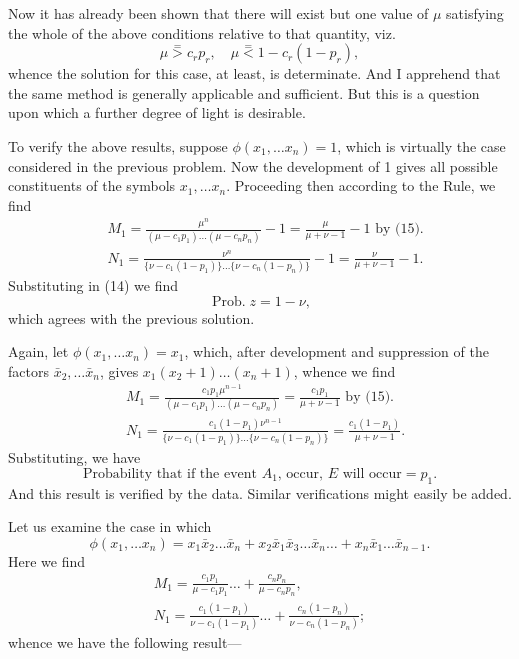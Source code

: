 \documentclass[oneside]{book}
\begin{document}
Now it has already been shown that there will exist but one
value of $\mu$ satisfying the whole of the above conditions relative
to that quantity, viz.
\[
  \mu \stackrel{=}{>} c_r p_r,\quad
  \mu \stackrel{=}{<} 1 - c_r(1-p_r),
\]
whence the solution for this case, at least, is determinate. And I
apprehend that the same method is generally applicable and
sufficient. But this is a question upon which a further degree of
light is desirable.

To verify the above results, suppose $\phi(x_1,\dotsc x_n) = 1$, which is
virtually the case considered in the previous problem. Now the
development of 1 gives all possible constituents of the symbols %
$x_1,\dotsc x_n$. Proceeding then according to the Rule, we find
\begin{align*}
& M_1 = \frac{\mu^n}{(\mu-c_1 p_1)\dotsc (\mu-c_n p_n)} - 1
= \frac{\mu}{\mu + \nu - 1}-1 \text{ by (15)}. \\
& N_1
= \frac{\nu^n}{ \{\nu - c_1(1-p_1)\}\dotsc \{\nu - c_n(1-p_n)\} } - 1 = \frac{\nu}{\mu+\nu-1}-1.
\end{align*}
Substituting in (14) we find
\begin{equation*}
\operatorname{Prob. } z = 1-\nu,
\end{equation*}
which agrees with the previous solution.

Again, let $\phi(x_1, \dotsc x_n) = x_1$, which, after development and
suppression of the factors $\bar{x}_2, \dotsc \bar{x}_n$, gives
$x_1 (x_2 + 1)\dotsc (x_n+1)$, whence
we find
\begin{align*}
& M_1
= \frac{c_1 p_1 \mu^{n-1}}{(\mu-c_1 p_1)\dotsc (\mu-c_n p_n)}
= \frac{c_1 p_1}{\mu + \nu - 1} \text{ by (15)}. \\
& N_1
= \frac{c_1 (1-p_1)\nu^{n-1}}{ \{\nu - c_1(1-p_1)\} \dotsc \{\nu - c_n(1-p_n)\} }
= \frac{c_1(1-p_1)}{\mu+\nu-1}.
\end{align*}
Substituting, we have
\begin{equation*}
\text{Probability that if the event $A_1$, occur, $E$ will occur} = p_1.
\end{equation*}
And this result is verified by the data. Similar verifications
might easily be added.

Let us examine the case in which
\begin{equation*}
\phi(x_1,\dotsc x_n)
= x_1 \bar{x}_2 \dotsc \bar{x}_n
+ x_2 \bar{x}_1 \bar{x}_3 \dotsc \bar{x}_n \dotsc
+ x_n \bar{x}_1 \dotsc \bar{x}_{n-1}.
\end{equation*}
Here we find
\begin{gather*}
M_1 = \frac{c_1 p_1}{\mu - c_1 p_1} \dotsc
    + \frac{c_n p_n}{\mu - c_n p_n}, \\
N_1 = \frac{c_1 (1-p_1)}{\nu - c_1(1-p_1)} \dotsc
    + \frac{c_n (1-p_n)}{\nu - c_n(1-p_n)};
\end{gather*}
whence we have the following result---
\end{document}
